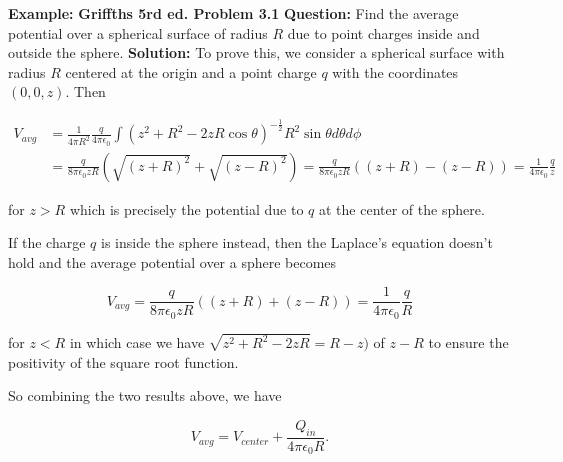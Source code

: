 \documentclass[a4paper,12pt]{report}
\begin{document}
	\begin{example_template}
		\textbf{Example:} \textbf{Griffths 5rd ed. Problem 3.1} \newline \newline
		\textbf{Question:} Find the average potential over a spherical surface of radius \(R\) due to point charges inside and outside the sphere.
		\newline \newline
		\textbf{Solution:} To prove this, we consider a spherical surface with radius \(R\) centered at the origin and a point charge \(q\) with the coordinates \((0,0,z)\). Then
		
		\begin{equation}
			\begin{aligned}
				V_{avg} &= \frac{1}{4\pi R^2} \frac{q}{4\pi\epsilon_0} \int (z^2+R^2-2zR\cos \theta )^{-\frac{1}{2}} R^2\sin \theta d\theta d\phi \\ &= \frac{q}{8\pi \epsilon_0zR} (\sqrt{(z+R)^2} + \sqrt{(z-R)^2} ) = \frac{q}{8\pi \epsilon_0zR} ((z+R)-(z-R)) = \frac{1}{4\pi\epsilon_0} \frac{q}{z} 
			\end{aligned}
		\end{equation}
		
		for \(z > R\) which is precisely the potential due to \(q\) at the center of the sphere.
		
		If the charge \(q\) is inside the sphere instead, then the Laplace's equation doesn't hold and the average potential over a sphere becomes
		
		\begin{equation}
			V_{avg} =  \frac{q}{8\pi \epsilon_0zR} ((z+R) + (z-R)) = \frac{1}{4\pi\epsilon_0} \frac{q}{R}
		\end{equation}
		
		for \(z < R\) in which case we have \(\sqrt{z^2+R^2-2zR} = R - z)\) of \(z-R\) to ensure the positivity of the square root function. 
		
		So combining the two results above, we have 
		
		\begin{equation}
			V_{avg} = V_{center} + \frac{Q_{in} }{4\pi \epsilon_0 R} .
		\end{equation}
		
	\end{example_template}
	
\end{document}
